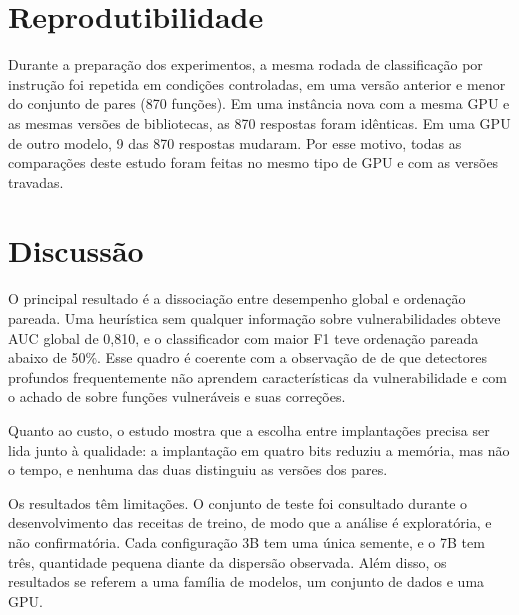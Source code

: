 \section{Reprodutibilidade}

Durante a preparação dos experimentos, a mesma rodada de classificação por instrução foi repetida em condições controladas, em uma versão anterior e menor do conjunto de pares (870 funções). Em uma instância nova com a mesma GPU e as mesmas versões de bibliotecas, as 870 respostas foram idênticas. Em uma GPU de outro modelo, 9 das 870 respostas mudaram. Por esse motivo, todas as comparações deste estudo foram feitas no mesmo tipo de GPU e com as versões travadas.

\section{Discussão}

O principal resultado é a dissociação entre desempenho global e ordenação pareada. Uma heurística sem qualquer informação sobre vulnerabilidades obteve AUC global de 0,810, e o classificador com maior F1 teve ordenação pareada abaixo de 50\%. Esse quadro é coerente com a observação de  de que detectores profundos frequentemente não aprendem características da vulnerabilidade e com o achado de  sobre funções vulneráveis e suas correções.

Quanto ao custo, o estudo mostra que a escolha entre implantações precisa ser lida junto à qualidade: a implantação em quatro bits reduziu a memória, mas não o tempo, e nenhuma das duas distinguiu as versões dos pares.

Os resultados têm limitações. O conjunto de teste foi consultado durante o desenvolvimento das receitas de treino, de modo que a análise é exploratória, e não confirmatória. Cada configuração 3B tem uma única semente, e o 7B tem três, quantidade pequena diante da dispersão observada. Além disso, os resultados se referem a uma família de modelos, um conjunto de dados e uma GPU.
